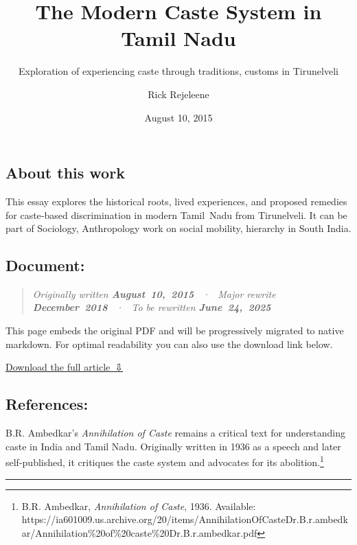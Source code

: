 \documentclass[
]{article}
\title{The Modern Caste System in Tamil Nadu}
\subtitle{Exploration of experiencing caste through traditions, customs
in Tirunelveli}
\author{Rick Rejeleene}
\date{August 10, 2015}
\renewcommand*\contentsname{Table of contents}
\newcommand\contentsname{Table of contents}
\begin{document}
\maketitle

\renewcommand*\contentsname{Table of contents}
{
\hypersetup{linkcolor=}
\setcounter{tocdepth}{3}
\tableofcontents
}

\subsection{About this work}\label{about}

This essay explores the historical roots, lived experiences, and
proposed remedies for caste‑based discrimination in modern Tamil~Nadu
from Tirunelveli. It can be part of Sociology, Anthropology work on
social mobility, hierarchy in South India.

\subsection{Document:}\label{document}

\begin{quote}
\emph{Originally written \textbf{August~10,~2015} ~·~ Major rewrite
\textbf{December~2018} ~·~ To be rewritten \textbf{June~24,~2025}}
\end{quote}

\begin{tcolorbox}[enhanced jigsaw, opacitybacktitle=0.6, opacityback=0, rightrule=.15mm, arc=.35mm, colframe=quarto-callout-note-color-frame, colbacktitle=quarto-callout-note-color!10!white, title=\textcolor{quarto-callout-note-color}{\faInfo}\hspace{0.5em}{Note}, leftrule=.75mm, titlerule=0mm, breakable, left=2mm, colback=white, bottomrule=.15mm, bottomtitle=1mm, coltitle=black, toptitle=1mm, toprule=.15mm]

This page embeds the original PDF and will be progressively migrated to
native markdown. For optimal readability you can also use the download
link below.

\end{tcolorbox}

\href{Caste-System-Rick.pdf}{Download the full article~⇩}

\subsection{References:}\label{references}

B.R. Ambedkar's \emph{Annihilation of Caste} remains a critical text for
understanding caste in India and Tamil Nadu. Originally written in 1936
as a speech and later self-published, it critiques the caste system and
advocates for its abolition.\footnote{B.R. Ambedkar, \emph{Annihilation
  of Caste}, 1936. Available:
  https://ia601009.us.archive.org/20/items/AnnihilationOfCasteDr.B.r.ambedkar/Annihilation\%20of\%20caste\%20Dr.B.r.ambedkar.pdf}

\begin{center}\rule{0.5\linewidth}{0.5pt}\end{center}
\end{document}

